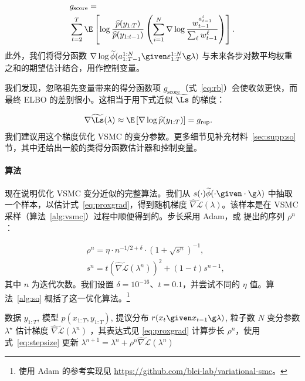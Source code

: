 \begin{align}
&g_{\text{score}} = 
\nonumber\\
& \sum_{t=2}^{T}
\E
\left[  
\log \frac{\widehat{p}(y_{1:T})}{\widehat{p}(y_{1:t-1})}
\left(\sum_{i=1}^N \nabla \log \frac{w_{t-1}^{a_{t-1}^i}}{\sum_\ell w_{t-1}^\ell}\right)
 \right].\label{eq:rb}
\end{align}
此外，我们将得分函数 $\nabla\log\widetilde\phi(a_{1:T-1}^{1:N}\given\varepsilon_{1:T}^{1:N}\g\lambda)$ 与未来各步对数平均权重之和的期望估计结合，用作控制变量\citep{Ranganath2014}。

我们发现，忽略祖先变量带来的得分函数项 $g_{\text{score}}$（式~\eqref{eq:rb}）会使收敛更快，而最终 ELBO 的差别很小。这相当于用下式近似 $\widetilde\Ls$ 的梯度：

\begin{align}
\nabla \widetilde\Ls(\lambda) &\approx \E
\left[ \nabla\log \widehat{p}(y_{1:T})  \right] = g_{\text{rep}}.
\label{eq:proxgrad}
\end{align}
我们建议用这个梯度优化 VSMC 的变分参数。更多细节见补充材料~\ref{sec:supp:so} 节，其中还给出一般的类得分函数估计器和控制变量。

\paragraph{算法}
现在说明优化 VSMC 变分近似的完整算法。我们从 $s(\cdot)\widetilde\phi(\cdot\given\cdot\g\lambda)$ 中抽取一个样本，以估计式~\eqref{eq:proxgrad}，得到随机梯度 $\widehat\nabla\widetilde{\mathcal L}(\lambda)$。该样本是在 VSMC 采样（算法~\ref{alg:vsmc}）过程中顺便得到的。步长采用 Adam\citep{KingmaB2015}，或 \citet{Kucukelbir2016} 提出的序列 $\rho^n$：

\begin{align}
    &\rho^n = \eta \cdot n^{-1/2 + \delta} \cdot \left(1 + 
    \sqrt{s^n}\right)^{-1}, \nonumber\\
    &s^n = t \left( \widehat \nabla \widetilde{\mathcal{L}}(\lambda^n) \right)^2 + (1-t) s^{n-1},
    \label{eq:stepsize}
\end{align}
其中 $n$ 为迭代次数。我们设置 $\delta=10^{-16}$、$t=0.1$，并尝试不同的 $\eta$ 值。算法~\ref{alg:so} 概括了这一优化算法。\footnote{使用 Adam 的参考实现见 \url{https://github.com/blei-lab/variational-smc}。}

\begin{algorithm}[htbp]
\caption{VSMC 的随机优化}\label{alg:so}
\begin{algorithmic}[1]
\REQUIRE 数据 $y_{1:T}$, 模型 $p(x_{1:T},y_{1:T})$, 提议分布 
$r(x_t\given x_{t-1}\g\lambda)$, 粒子数 $N$
\ENSURE 变分参数 $\lambda^\star$
\REPEAT
\STATE 估计梯度 $\widehat \nabla \widetilde{\mathcal{L}}(\lambda^n)$ 
，其表达式见 \eqref{eq:proxgrad}
\STATE 计算步长 $\rho^n$，使用式~\eqref{eq:stepsize}
\STATE 更新 $\lambda^{n+1} = \lambda^n + \rho^n \widehat \nabla \widetilde{\mathcal{L}}(\lambda^n)$
\end{algorithmic}
\end{algorithm}

